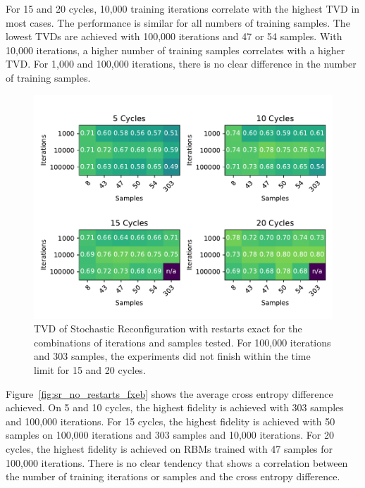 For 15 and 20 cycles, 10,000 training iterations correlate with the highest TVD in most cases.
The performance is similar for all numbers of training samples. The lowest TVDs are achieved with 100,000
iterations and 47 or 54 samples. With 10,000 iterations, a higher number of training samples correlates 
with a higher TVD. For 1,000 and 100,000 iterations, there is no clear difference in the number of training 
samples.

\begin{figure}[H]
  \centering
  \includegraphics[width=\textwidth]{figures/results/SR-restarts-not-learned/tvd_heatmap.pdf}
  \caption[TVD of Stochastic Reconfiguration with restarts exact]{TVD of Stochastic 
  Reconfiguration with restarts exact for the combinations of iterations and samples tested.
  For 100,000 iterations and 303 samples, the experiments did not finish within the time limit for 15 and 20 cycles.}
  \label{fig:sr_exact_tvd}
\end{figure}

Figure~\ref{fig:sr_no_restarts_fxeb} shows the average cross entropy difference achieved. On 5 and 10
cycles, the highest fidelity is achieved with 303 samples and 100,000 iterations. 
For 15 cycles, the highest fidelity is achieved with 50 samples on 100,000 iterations and 
303 samples and 10,000 iterations.
For 20 cycles, the highest fidelity is achieved on RBMs trained with 47 samples for 100,000 iterations.
There is no clear tendency that shows a correlation between 
the number of training iterations or samples and the cross entropy difference.

